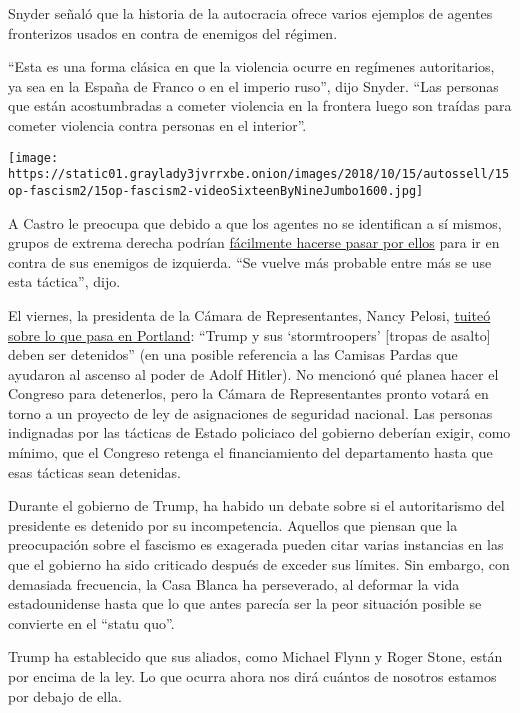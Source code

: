 Snyder señaló que la historia de la autocracia ofrece varios ejemplos de
agentes fronterizos usados en contra de enemigos del régimen.

``Esta es una forma clásica en que la violencia ocurre en regímenes
autoritarios, ya sea en la España de Franco o en el imperio ruso'', dijo
Snyder. ``Las personas que están acostumbradas a cometer violencia en la
frontera luego son traídas para cometer violencia contra personas en el
interior''.

\texttt{[image: https://static01.graylady3jvrrxbe.onion/images/2018/10/15/autossell/15op-fascism2/15op-fascism2-videoSixteenByNineJumbo1600.jpg]}

A Castro le preocupa que debido a que los agentes no se identifican a sí
mismos, grupos de extrema derecha podrían
\href{https://twitter.com/JoaquinCastrotx/status/1284956181400899585?s=20}{fácilmente
hacerse pasar por ellos} para ir en contra de sus enemigos de izquierda.
``Se vuelve más probable entre más se use esta táctica'', dijo.

El viernes, la presidenta de la Cámara de Representantes, Nancy Pelosi,
\href{https://twitter.com/SpeakerPelosi/status/1284294427654197248?s=20}{tuiteó
sobre lo que pasa en Portland}: ``Trump y sus `stormtroopers' {[}tropas
de asalto{]} deben ser detenidos'' (en una posible referencia a las
Camisas Pardas que ayudaron al ascenso al poder de Adolf Hitler). No
mencionó qué planea hacer el Congreso para detenerlos, pero la Cámara de
Representantes pronto votará en torno a un proyecto de ley de
asignaciones de seguridad nacional. Las personas indignadas por las
tácticas de Estado policiaco del gobierno deberían exigir, como mínimo,
que el Congreso retenga el financiamiento del departamento hasta que
esas tácticas sean detenidas.

Durante el gobierno de Trump, ha habido un debate sobre si el
autoritarismo del presidente es detenido por su incompetencia. Aquellos
que piensan que la preocupación sobre el fascismo es exagerada pueden
citar varias instancias en las que el gobierno ha sido criticado después
de exceder sus límites. Sin embargo, con demasiada frecuencia, la Casa
Blanca ha perseverado, al deformar la vida estadounidense hasta que lo
que antes parecía ser la peor situación posible se convierte en el
``statu quo''.

Trump ha establecido que sus aliados, como Michael Flynn y Roger Stone,
están por encima de la ley. Lo que ocurra ahora nos dirá cuántos de
nosotros estamos por debajo de ella.

